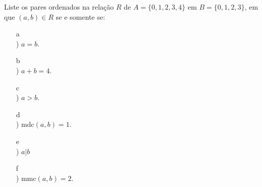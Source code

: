 \documentclass{minimal}
\begin{document}
Liste os pares ordenados na relação $R$ de $A = \{0, 1, 2, 3, 4\}$ em $B = \{0, 1, 2, 3\}$, em que $(a, b) \in R$ se e somente se:

\begin{enumerate}
    \item[a\\)] $a = b$.
    \item[b\\)] $a + b = 4$.
    \item[c\\)] $a > b$.
    \item[d\\)] $\text{mdc}(a, b) = 1$.
    \item[e\\)] $a | b$
    \item[f\\)] $\text{mmc}(a, b) = 2$.
\end{enumerate}
\\
\end{document}
